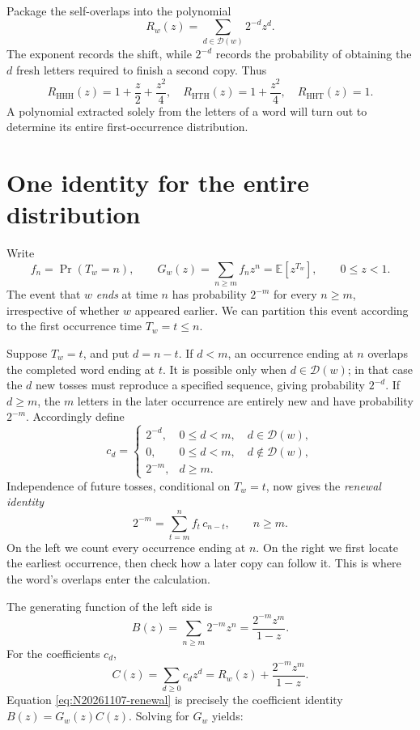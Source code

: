 Package the self-overlaps into the polynomial
\begin{equation}
 R_w(z)=\sum_{d\in\mathcal D(w)}2^{-d}z^d.
 \label{eq:N20261107-correlation}
\end{equation}
The exponent records the shift, while \(2^{-d}\) records the probability of obtaining the \(d\) fresh letters required to finish a second copy. Thus
\[
 R_{\mathrm{HHH}}(z)=1+\frac z2+\frac{z^2}{4},
 \quad
 R_{\mathrm{HTH}}(z)=1+\frac{z^2}{4},
 \quad
 R_{\mathrm{HHT}}(z)=1.
\]
A polynomial extracted solely from the letters of a word will turn out to determine its entire first-occurrence distribution.

\section{One identity for the entire distribution}

Write
\[
 f_n=\Pr(T_w=n),\qquad
 G_w(z)=\sum_{n\geq m}f_nz^n=\mathbb E[z^{T_w}],
 \qquad 0\leq z<1.
\]
The event that \(w\) \emph{ends} at time \(n\) has probability \(2^{-m}\) for every \(n\geq m\), irrespective of whether \(w\) appeared earlier. We can partition this event according to the first occurrence time \(T_w=t\leq n\).

Suppose \(T_w=t\), and put \(d=n-t\). If \(d<m\), an occurrence ending at \(n\) overlaps the completed word ending at \(t\). It is possible only when \(d\in\mathcal D(w)\); in that case the \(d\) new tosses must reproduce a specified sequence, giving probability \(2^{-d}\). If \(d\geq m\), the \(m\) letters in the later occurrence are entirely new and have probability \(2^{-m}\). Accordingly define
\[
 c_d=
 \begin{cases}
 2^{-d},&0\leq d<m,\quad d\in\mathcal D(w),\\
 0,&0\leq d<m,\quad d\notin\mathcal D(w),\\
 2^{-m},&d\geq m.
 \end{cases}
\]
Independence of future tosses, conditional on \(T_w=t\), now gives the \emph{renewal identity}
\begin{equation}
 2^{-m}=\sum_{t=m}^{n}f_t\,c_{n-t},
 \qquad n\geq m.
 \label{eq:N20261107-renewal}
\end{equation}
On the left we count every occurrence ending at \(n\). On the right we first locate the earliest occurrence, then check how a later copy can follow it. This is where the word's overlaps enter the calculation.

The generating function of the left side is
\[
 B(z)=\sum_{n\geq m}2^{-m}z^n
      =\frac{2^{-m}z^m}{1-z}.
\]
For the coefficients \(c_d\),
\[
 C(z)=\sum_{d\geq0}c_dz^d
     =R_w(z)+\frac{2^{-m}z^m}{1-z}.
\]
Equation \eqref{eq:N20261107-renewal} is precisely the coefficient identity \(B(z)=G_w(z)C(z)\). Solving for \(G_w\) yields:

